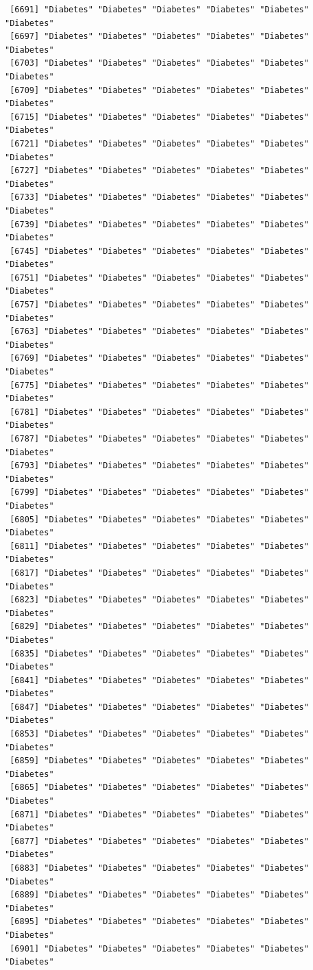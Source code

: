 \documentclass[
  letterpaper,
  DIV=11,
  numbers=noendperiod]{scrartcl}
\begin{document}
\begin{verbatim}
 [6691] "Diabetes" "Diabetes" "Diabetes" "Diabetes" "Diabetes" "Diabetes"
 [6697] "Diabetes" "Diabetes" "Diabetes" "Diabetes" "Diabetes" "Diabetes"
 [6703] "Diabetes" "Diabetes" "Diabetes" "Diabetes" "Diabetes" "Diabetes"
 [6709] "Diabetes" "Diabetes" "Diabetes" "Diabetes" "Diabetes" "Diabetes"
 [6715] "Diabetes" "Diabetes" "Diabetes" "Diabetes" "Diabetes" "Diabetes"
 [6721] "Diabetes" "Diabetes" "Diabetes" "Diabetes" "Diabetes" "Diabetes"
 [6727] "Diabetes" "Diabetes" "Diabetes" "Diabetes" "Diabetes" "Diabetes"
 [6733] "Diabetes" "Diabetes" "Diabetes" "Diabetes" "Diabetes" "Diabetes"
 [6739] "Diabetes" "Diabetes" "Diabetes" "Diabetes" "Diabetes" "Diabetes"
 [6745] "Diabetes" "Diabetes" "Diabetes" "Diabetes" "Diabetes" "Diabetes"
 [6751] "Diabetes" "Diabetes" "Diabetes" "Diabetes" "Diabetes" "Diabetes"
 [6757] "Diabetes" "Diabetes" "Diabetes" "Diabetes" "Diabetes" "Diabetes"
 [6763] "Diabetes" "Diabetes" "Diabetes" "Diabetes" "Diabetes" "Diabetes"
 [6769] "Diabetes" "Diabetes" "Diabetes" "Diabetes" "Diabetes" "Diabetes"
 [6775] "Diabetes" "Diabetes" "Diabetes" "Diabetes" "Diabetes" "Diabetes"
 [6781] "Diabetes" "Diabetes" "Diabetes" "Diabetes" "Diabetes" "Diabetes"
 [6787] "Diabetes" "Diabetes" "Diabetes" "Diabetes" "Diabetes" "Diabetes"
 [6793] "Diabetes" "Diabetes" "Diabetes" "Diabetes" "Diabetes" "Diabetes"
 [6799] "Diabetes" "Diabetes" "Diabetes" "Diabetes" "Diabetes" "Diabetes"
 [6805] "Diabetes" "Diabetes" "Diabetes" "Diabetes" "Diabetes" "Diabetes"
 [6811] "Diabetes" "Diabetes" "Diabetes" "Diabetes" "Diabetes" "Diabetes"
 [6817] "Diabetes" "Diabetes" "Diabetes" "Diabetes" "Diabetes" "Diabetes"
 [6823] "Diabetes" "Diabetes" "Diabetes" "Diabetes" "Diabetes" "Diabetes"
 [6829] "Diabetes" "Diabetes" "Diabetes" "Diabetes" "Diabetes" "Diabetes"
 [6835] "Diabetes" "Diabetes" "Diabetes" "Diabetes" "Diabetes" "Diabetes"
 [6841] "Diabetes" "Diabetes" "Diabetes" "Diabetes" "Diabetes" "Diabetes"
 [6847] "Diabetes" "Diabetes" "Diabetes" "Diabetes" "Diabetes" "Diabetes"
 [6853] "Diabetes" "Diabetes" "Diabetes" "Diabetes" "Diabetes" "Diabetes"
 [6859] "Diabetes" "Diabetes" "Diabetes" "Diabetes" "Diabetes" "Diabetes"
 [6865] "Diabetes" "Diabetes" "Diabetes" "Diabetes" "Diabetes" "Diabetes"
 [6871] "Diabetes" "Diabetes" "Diabetes" "Diabetes" "Diabetes" "Diabetes"
 [6877] "Diabetes" "Diabetes" "Diabetes" "Diabetes" "Diabetes" "Diabetes"
 [6883] "Diabetes" "Diabetes" "Diabetes" "Diabetes" "Diabetes" "Diabetes"
 [6889] "Diabetes" "Diabetes" "Diabetes" "Diabetes" "Diabetes" "Diabetes"
 [6895] "Diabetes" "Diabetes" "Diabetes" "Diabetes" "Diabetes" "Diabetes"
 [6901] "Diabetes" "Diabetes" "Diabetes" "Diabetes" "Diabetes" "Diabetes"

\end{verbatim}
\end{document}
